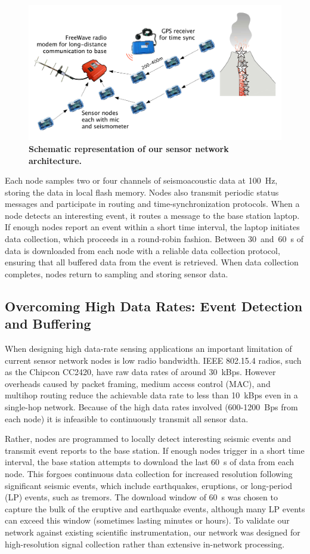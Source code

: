 \begin{figure}[t!]
\begin{center}
\includegraphics[width=0.7\hsize]{./3-evaluation/figs/architecture.pdf}
\end{center}
\caption{\textbf{Schematic representation of our sensor network
architecture.}}
\label{evaluation-fig-architecture}
\end{figure}

Each node samples two or four channels of seismoacoustic data at 100~Hz,
storing the data in local flash memory. Nodes also transmit periodic status
messages and participate in routing and time-synchronization protocols. When
a node detects an interesting event, it routes a message to the base station
laptop. If enough nodes report an event within a short time interval, the
laptop initiates data collection, which proceeds in a round-robin fashion.
Between 30~and~60~s of data is downloaded from each node with a reliable data
collection protocol, ensuring that all buffered data from the event is
retrieved. When data collection completes, nodes return to sampling and
storing sensor data.

\subsection{Overcoming High Data Rates: Event Detection and Buffering}

When designing high data-rate sensing applications an important limitation of
current sensor network nodes is low radio bandwidth. IEEE 802.15.4 radios,
such as the Chipcon CC2420, have raw data rates of around 30~kBps. However
overheads caused by packet framing, medium access control (MAC), and multihop
routing reduce the achievable data rate to less than 10~kBps even in a
single-hop network. Because of the high data rates involved (600-1200~Bps
from each node) it is infeasible to continuously transmit all sensor data.

Rather, nodes are programmed to locally detect interesting seismic events and
transmit event reports to the base station. If enough nodes trigger in a
short time interval, the base station attempts to download the last 60~s of
data from each node. This forgoes continuous data collection for increased
resolution following significant seismic events, which include earthquakes,
eruptions, or long-period (LP) events, such as tremors. The download window
of 60~s was chosen to capture the bulk of the eruptive and earthquake events,
although many LP events can exceed this window (sometimes lasting minutes or
hours). To validate our network against existing scientific instrumentation,
our network was designed for high-resolution signal collection rather than
extensive in-network processing.

